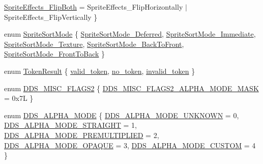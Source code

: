 \begin{DoxyCompactItemize}
\hyperlink{namespacemage_a06ff9ac76b1e0636cc8949c3f0d4ac46ade02358677bb38062999f4edc9d25055}{Sprite\+Effects\+\_\+\+Flip\+Both} = Sprite\+Effects\+\_\+\+Flip\+Horizontally $\vert$ Sprite\+Effects\+\_\+\+Flip\+Vertically
 \}
\item 
enum \hyperlink{namespacemage_a256fa5833eecc408923de7ffadb5e014}{Sprite\+Sort\+Mode} \{ \newline
\hyperlink{namespacemage_a256fa5833eecc408923de7ffadb5e014a80d3415039a297067a179e981ef0dada}{Sprite\+Sort\+Mode\+\_\+\+Deferred}, 
\hyperlink{namespacemage_a256fa5833eecc408923de7ffadb5e014a1860f7ba337b06db99a5aa4d1773c47e}{Sprite\+Sort\+Mode\+\_\+\+Immediate}, 
\hyperlink{namespacemage_a256fa5833eecc408923de7ffadb5e014acd196441d0dbb56cb50355105549e09d}{Sprite\+Sort\+Mode\+\_\+\+Texture}, 
\hyperlink{namespacemage_a256fa5833eecc408923de7ffadb5e014a1ed9f5cf1fd98919f7bf075b3d75baa6}{Sprite\+Sort\+Mode\+\_\+\+Back\+To\+Front}, 
\newline
\hyperlink{namespacemage_a256fa5833eecc408923de7ffadb5e014a12295f7eac8babb6d7e52b765715382f}{Sprite\+Sort\+Mode\+\_\+\+Front\+To\+Back}
 \}
\item 
enum \hyperlink{namespacemage_a2178ba2411db5912f41b2e7698c2037d}{Token\+Result} \{ \hyperlink{namespacemage_a2178ba2411db5912f41b2e7698c2037daadeba2cdda999b6fefb8f7921d465be2}{valid\+\_\+token}, 
\hyperlink{namespacemage_a2178ba2411db5912f41b2e7698c2037da6eb617de598c0ac439b9001a864fe26b}{no\+\_\+token}, 
\hyperlink{namespacemage_a2178ba2411db5912f41b2e7698c2037dab66020fcbf2ef08e505b39104a5d941a}{invalid\+\_\+token}
 \}
\item 
enum \hyperlink{namespacemage_a0943eceedce2e66b3b66d0566b15c712}{D\+D\+S\+\_\+\+M\+I\+S\+C\+\_\+\+F\+L\+A\+G\+S2} \{ \hyperlink{namespacemage_a0943eceedce2e66b3b66d0566b15c712af6954b93e1e18fa5366ebb55d65ecbcf}{D\+D\+S\+\_\+\+M\+I\+S\+C\+\_\+\+F\+L\+A\+G\+S2\+\_\+\+A\+L\+P\+H\+A\+\_\+\+M\+O\+D\+E\+\_\+\+M\+A\+SK} = 0x7L
 \}
\item 
enum \hyperlink{namespacemage_a0c586a2bad862f4858900ca121ca80c2}{D\+D\+S\+\_\+\+A\+L\+P\+H\+A\+\_\+\+M\+O\+DE} \{ \newline
\hyperlink{namespacemage_a0c586a2bad862f4858900ca121ca80c2ae15c70e072553fb579ef26eedb737768}{D\+D\+S\+\_\+\+A\+L\+P\+H\+A\+\_\+\+M\+O\+D\+E\+\_\+\+U\+N\+K\+N\+O\+WN} = 0, 
\hyperlink{namespacemage_a0c586a2bad862f4858900ca121ca80c2a2cfa12c9a40e943b5e51043c45db5f95}{D\+D\+S\+\_\+\+A\+L\+P\+H\+A\+\_\+\+M\+O\+D\+E\+\_\+\+S\+T\+R\+A\+I\+G\+HT} = 1, 
\hyperlink{namespacemage_a0c586a2bad862f4858900ca121ca80c2a6dfa3f7a9c0031bc87cc35d8365e3b74}{D\+D\+S\+\_\+\+A\+L\+P\+H\+A\+\_\+\+M\+O\+D\+E\+\_\+\+P\+R\+E\+M\+U\+L\+T\+I\+P\+L\+I\+ED} = 2, 
\hyperlink{namespacemage_a0c586a2bad862f4858900ca121ca80c2a0f5075a259bfecc6fb934b92bcc6dd1d}{D\+D\+S\+\_\+\+A\+L\+P\+H\+A\+\_\+\+M\+O\+D\+E\+\_\+\+O\+P\+A\+Q\+UE} = 3, 
\newline
\hyperlink{namespacemage_a0c586a2bad862f4858900ca121ca80c2a145fc5c46af6e8635680d59f55ce956f}{D\+D\+S\+\_\+\+A\+L\+P\+H\+A\+\_\+\+M\+O\+D\+E\+\_\+\+C\+U\+S\+T\+OM} = 4
 \}
\end{DoxyCompactItemize}
